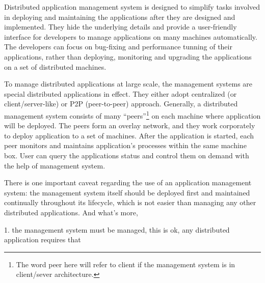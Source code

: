 


Distributed application management system is designed to
simplify tasks involved in deploying and maintaining the
applications after they are designed and implemented. They
hide the underlying details and provide a user-friendly
interface for developers to manage applications on many
machines automatically. The developers can focus on
bug-fixing and performance tunning of their applications,
rather than deploying, monitoring and upgrading the
applications on a set of distributed machines.

To manage distributed applications at large scale, the
management systems are special distributed applications in
effect. They either adopt centralized (or
client/server-like) or P2P (peer-to-peer) approach.
Generally, a distributed management system consists of many
``peers''\footnote{The word peer here will refer to client
if the management system is in client/sever architecture.}
on each machine where application will be deployed. The
peers form an overlay network, and they work corporately to
deploy application to a set of machines. After the
application is started, each peer monitors and maintains
application's processes within the same machine box. User
can query the applications status and control them on demand
with the help of management system.


There is one important caveat regarding the use of an
application management system: the management system itself
should be deployed first and maintained continually
throughout its lifecycle, which is not easier than managing
any other distributed applications. And what's more, 

1. the management system must be managed, this is ok, any
distributed application requires that

